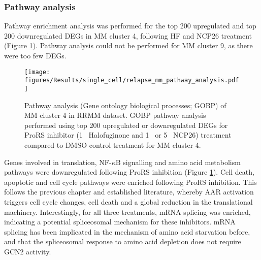 \subsubsection{Pathway analysis}
Pathway enrichment analysis was performed for the top 200 upregulated and top 200 downregulated DEGs in MM cluster 4, following HF and NCP26 treatment (Figure \ref{fig:relapse_mm_pathway_analysis}).
Pathway analysis could not be performed for MM cluster 9, as there were too few DEGs.
\begin{figure}[htb]
\centering
\texttt{[image: figures/Results/single\_cell/relapse\_mm\_pathway\_analysis.pdf]}
\caption[scRNA-seq MM cluster pathway analysis (relapsed MM)]{Pathway analysis (Gene ontology biological processes; GOBP) of MM cluster 4 in RRMM dataset.
GOBP pathway analysis performed using top 200 upregulated or downregulated DEGs for ProRS inhibitor (1\si{\micro\Molar} Halofuginone and 1\si{\micro\Molar} or 5\si{\micro\Molar}  NCP26) treatment compared to DMSO control treatment for MM cluster 4.
}
\label{fig:relapse_mm_pathway_analysis}
\end{figure}
Genes involved in translation, NF-$\kappa$B signalling and amino acid metabolism pathways were downregulated following ProRS inhibition (Figure \ref{fig:relapse_mm_pathway_analysis}).
Cell death, apoptotic and cell cycle pathways were enriched following ProRS inhibition.
This follows the previous chapter and established literature, whereby AAR activation triggers cell cycle changes, cell death and a global reduction in the translational machinery.
Interestingly, for all three treatments, mRNA splicing was enriched, indicating a potential spliceosomal mechanism for these inhibitors.
mRNA splicing has been implicated in the mechanism of amino acid starvation before\cite{deval2009amino}, and that the spliceosomal response to amino acid depletion does not require GCN2 activity.

